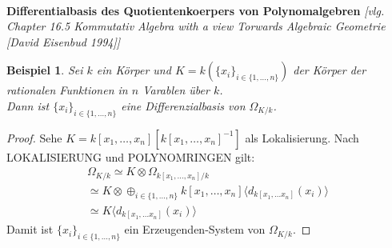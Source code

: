 \documentclass[10pt,a4paper]{report}
\newcommand{\comment}[1]{}
\newcommand{\ModulsOfDifferenzials}{Kommutativ Algebra with a view Torwards Algebraic Geometrie [David Eisenbud 1994]}
\newcounter{Aussage}[chapter]
\newtheorem{bsp}[Aussage]{Beispiel}
\newcommand{\divR}[2]{\Omega_{#1/#2}}
\newcommand{\divf}[1]{d_{#1}}
\newcommand{\tensor}[3]{#1 \otimes #3}
\newcommand{\lok}[2]{#1 [#2^{-1}]}
\begin{document}
\ \\
\textbf{Differentialbasis des Quotientenkoerpers von Polynomalgebren} \textit{[vlg. Chapter 16.5 \ModulsOfDifferenzials]}
\begin{bsp}\comment{\label{Differentialbasis des Quotientenkoerpers von Polynomalgebren}}
Sei $k$ ein Körper und $K = k(\lbrace x_i \rbrace_{i \in \lbrace 1,\dots,n \rbrace})$ der Körper der rationalen Funktionen in $n$ Varablen über $k$.\\
Dann ist $\lbrace x_i \rbrace_{i \in \lbrace 1,\dots,n \rbrace}$ eine Differenzialbasis von $\divR{K}{k}$.
\end{bsp}
\begin{proof}
Sehe $K = \lok{k[x_1,\dots,x_n]}{k[x_1,\dots,x_n]}$ als Lokalisierung. Nach LOKALISIERUNG und POLYNOMRINGEN gilt:
\begin{gather*}
\divR{K}{k} \simeq \tensor{K}{k[x_1,\dots,x_n]}{\divR{k[x_1,\dots,x_n]}{k}} \\
\simeq \tensor{K}{k[x_1,\dots,x_n]}{\oplus_{i \in \lbrace 1,\dots,n \rbrace} k[x_1,\dots,x_n]\langle \divf{k[x_1,\dots x_n]}(x_i) \rangle} \\
\simeq K\langle \divf{k[x_1,\dots x_n]}(x_i) \rangle
\end{gather*}
Damit ist $\lbrace x_i \rbrace_{i \in \lbrace 1,\dots,n \rbrace}$ ein Erzeugenden-System von $\divR{K}{k}$.
\end{proof}
\end{document}
